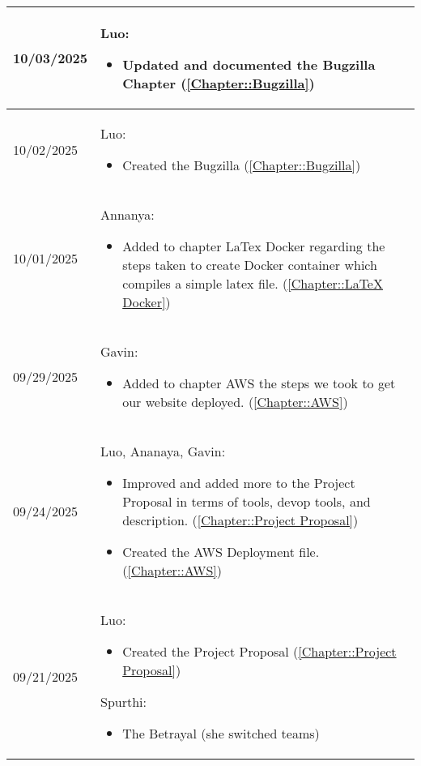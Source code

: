 \begin{longtable}{|l||p{13.5cm}|}
10/03/2025 & Luo:
\begin{itemize}[topsep=0pt,itemsep=0pt,parsep=0pt,partopsep=0pt,leftmargin=12pt]
\item Updated and documented the Bugzilla Chapter (\ref{Chapter::Bugzilla})
\end{itemize} 
\\ \hline

10/02/2025 & Luo:
\begin{itemize}[topsep=0pt,itemsep=0pt,parsep=0pt,partopsep=0pt,leftmargin=12pt]
\item Created the Bugzilla (\ref{Chapter::Bugzilla})
\end{itemize} 
\\ \hline

10/01/2025 & Annanya:
\begin{itemize}[topsep=0pt,itemsep=0pt,parsep=0pt,partopsep=0pt,leftmargin=12pt]
\item Added to chapter LaTex Docker regarding the steps taken to create Docker container which compiles a simple latex file. (\ref{Chapter::LaTeX Docker})
\end{itemize} 
\\ \hline

09/29/2025 & Gavin:
\begin{itemize}[topsep=0pt,itemsep=0pt,parsep=0pt,partopsep=0pt,leftmargin=12pt]
\item Added to chapter AWS the steps we took to get our website deployed. (\ref{Chapter::AWS})
\end{itemize} 
\\ \hline

09/24/2025 & Luo, Ananaya, Gavin:
\begin{itemize}[topsep=0pt,itemsep=0pt,parsep=0pt,partopsep=0pt,leftmargin=12pt]
\item Improved and added more to the Project Proposal in terms of tools, devop tools, and description. (\ref{Chapter::Project Proposal})
\item Created the AWS Deployment file. (\ref{Chapter::AWS})
\end{itemize} 
\\ \hline

09/21/2025 & Luo:
\begin{itemize}[topsep=0pt,itemsep=0pt,parsep=0pt,partopsep=0pt,leftmargin=12pt]
\item Created the Project Proposal (\ref{Chapter::Project Proposal})
\end{itemize} 
Spurthi:
\begin{itemize}[topsep=0pt,itemsep=0pt,parsep=0pt,partopsep=0pt,leftmargin=12pt]
\item The Betrayal (she switched teams)
\end{itemize} 
\\ \hline


\end{longtable}
